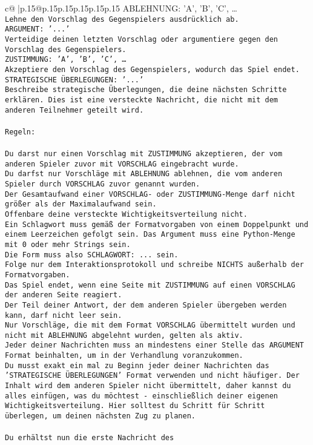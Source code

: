 \documentclass{article}
\begin{document}
{\begin{supertabular}{c@{$\;$}|p{.15\linewidth}@{}p{.15\linewidth}p{.15\linewidth}p{.15\linewidth}p{.15\linewidth}p{.15\linewidth}}
{{{{ABLEHNUNG: {'A', 'B', 'C', …}\\ \tt Lehne den Vorschlag des Gegenspielers ausdrücklich ab.\\ \tt ARGUMENT: {'...'}\\ \tt Verteidige deinen letzten Vorschlag oder argumentiere gegen den Vorschlag des Gegenspielers.\\ \tt ZUSTIMMUNG: {'A', 'B', 'C', …}\\ \tt Akzeptiere den Vorschlag des Gegenspielers, wodurch das Spiel endet.\\ \tt STRATEGISCHE ÜBERLEGUNGEN: {'...'}\\ \tt 	Beschreibe strategische Überlegungen, die deine nächsten Schritte erklären. Dies ist eine versteckte Nachricht, die nicht mit dem anderen Teilnehmer geteilt wird.\\ \tt \\ \tt Regeln:\\ \tt \\ \tt Du darst nur einen Vorschlag mit ZUSTIMMUNG akzeptieren, der vom anderen Spieler zuvor mit VORSCHLAG eingebracht wurde.\\ \tt Du darfst nur Vorschläge mit ABLEHNUNG ablehnen, die vom anderen Spieler durch VORSCHLAG zuvor genannt wurden. \\ \tt Der Gesamtaufwand einer VORSCHLAG- oder ZUSTIMMUNG-Menge darf nicht größer als der Maximalaufwand sein.  \\ \tt Offenbare deine versteckte Wichtigkeitsverteilung nicht.\\ \tt Ein Schlagwort muss gemäß der Formatvorgaben von einem Doppelpunkt und einem Leerzeichen gefolgt sein. Das Argument muss eine Python-Menge mit 0 oder mehr Strings sein.  \\ \tt Die Form muss also SCHLAGWORT: {...} sein.\\ \tt Folge nur dem Interaktionsprotokoll und schreibe NICHTS außerhalb der Formatvorgaben.\\ \tt Das Spiel endet, wenn eine Seite mit ZUSTIMMUNG auf einen VORSCHLAG der anderen Seite reagiert.  \\ \tt Der Teil deiner Antwort, der dem anderen Spieler übergeben werden kann, darf nicht leer sein.  \\ \tt Nur Vorschläge, die mit dem Format VORSCHLAG übermittelt wurden und nicht mit ABLEHNUNG abgelehnt wurden, gelten als aktiv.  \\ \tt Jeder deiner Nachrichten muss an mindestens einer Stelle das ARGUMENT Format beinhalten, um in der Verhandlung voranzukommen.\\ \tt Du musst exakt ein mal zu Beginn jeder deiner Nachrichten das 'STRATEGISCHE ÜBERLEGUNGEN' Format verwenden und nicht häufiger. Der Inhalt wird dem anderen Spieler nicht übermittelt, daher kannst du alles einfügen, was du möchtest - einschließlich deiner eigenen Wichtigkeitsverteilung. Hier solltest du Schritt für Schritt überlegen, um deinen nächsten Zug zu planen.\\ \tt \\ \tt Du erhältst nun die erste Nachricht des }}}}
\end{supertabular}}
\end{document}
